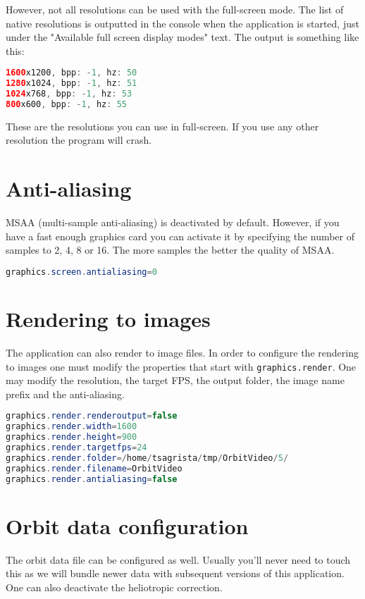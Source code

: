 \documentclass[
a4paper, %
11pt, %
onecolumn, %
openany, %
]{memoir}
\begin{document}
However, not all resolutions can be used with the full-screen mode.
The list of native resolutions is outputted in the console when
the application is started, just under the "Available full screen
display modes" text. The output is something like this:

\begin{lstlisting}[language=Java]
1600x1200, bpp: -1, hz: 50
1280x1024, bpp: -1, hz: 51
1024x768, bpp: -1, hz: 53
800x600, bpp: -1, hz: 55
\end{lstlisting}

These are the resolutions you can use in full-screen. If you use any other
resolution the program will crash.

\section{Anti-aliasing}
MSAA (multi-sample anti-aliasing) is deactivated by default. However, if you
have a fast enough graphics card you can activate it by specifying the
number of samples to 2, 4, 8 or 16. The more samples the better the quality of 
MSAA.
\begin{lstlisting}[language=Java]
graphics.screen.antialiasing=0
\end{lstlisting}

\section{Rendering to images}
The application can also render to image files. In order to configure the 
rendering to images one must modify the properties that start with \texttt{graphics.render}.
One may modify the resolution, the target FPS, the output folder, the 
image name prefix and the anti-aliasing.

\begin{lstlisting}[language=Java]
graphics.render.renderoutput=false
graphics.render.width=1600
graphics.render.height=900
graphics.render.targetfps=24
graphics.render.folder=/home/tsagrista/tmp/OrbitVideo/5/
graphics.render.filename=OrbitVideo
graphics.render.antialiasing=false
\end{lstlisting}

\section{Orbit data configuration}
The orbit data file can be configured as well. Usually you'll never need 
to touch this as we will bundle newer data with subsequent versions of 
this application. One can also deactivate the heliotropic correction.
\end{document}
